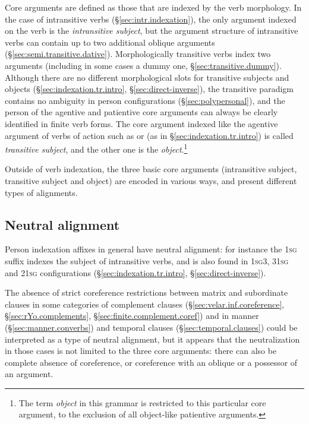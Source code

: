 Core arguments are defined as those that are indexed by the verb morphology. In the case of intransitive verbs (§\ref{sec:intr.indexation}), the only argument indexed on the verb is the \textit{intransitive subject}, but the argument structure of intransitive verbs can contain up to two additional oblique arguments (§\ref{sec:semi.transitive.dative}). Morphologically transitive verbs index two arguments (including in some cases a dummy one, §\ref{sec:transitive.dummy}). Although there are no different morphological slots for transitive subjects and objects (§\ref{sec:indexation.tr.intro}, §\ref{sec:direct-inverse}), the transitive paradigm contains no ambiguity in person configurations (§\ref{sec:polypersonal}), and the person of the agentive and patientive core arguments can always be clearly identified in finite verb forms. The core argument indexed like the agentive argument of verbs of action such as  or  (as in §\ref{sec:indexation.tr.intro}) is called \textit{transitive subject}, and the other one is the \textit{object}.\footnote{The term \textit{object} in this grammar is restricted to this particular core argument, to the exclusion of all object-like patientive arguments. }

Outside of verb indexation, the three basic core arguments (intransitive subject, transitive subject and object) are encoded in various ways, and present different types of alignments.
 
 \subsection{Neutral alignment}
Person indexation affixes in general have neutral alignment: for instance the \textsc{1sg} suffix   indexes the subject of intransitive verbs, and is also found in \textsc{1sg}\fl{}3, 3\fl{}\textsc{1sg} and 2\fl{}\textsc{1sg} configurations (§\ref{sec:indexation.tr.intro}, §\ref{sec:direct-inverse}).

The absence of strict coreference restrictions between matrix and subordinate clauses in some categories of complement clauses (§\ref{sec:velar.inf.coreference}, §\ref{sec:rYo.complements}, §\ref{sec:finite.complement.coref}) and in manner (§\ref{sec:manner.converbs}) and temporal clauses (§\ref{sec:temporal.clauses}) could be interpreted as a type of neutral alignment, but it appears that the neutralization in those cases is not limited to the three core arguments: there can also be complete absence of coreference, or coreference with an oblique or a possessor of an argument.

